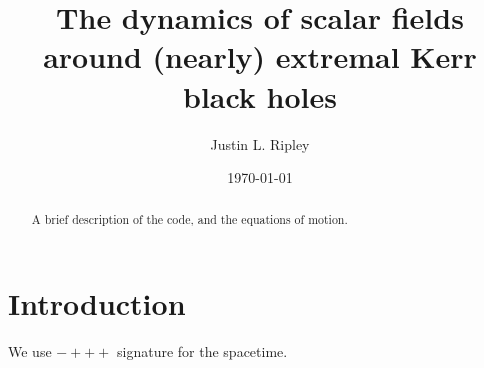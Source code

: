 \documentclass[%
 prd,
amsmath,amssymb,
preprint,%
]{revtex4-1}
\begin{document}

\title{
   The dynamics of scalar fields around (nearly) extremal Kerr black holes
}

\author{Justin L. Ripley}
%

\date{\today}%

\begin{abstract}
   A brief description of the code, and the equations of motion.
\end{abstract}

\maketitle

%
\section{\label{sec:introduction}Introduction}
We use $-+++$ signature for the spacetime.
\end{document}
